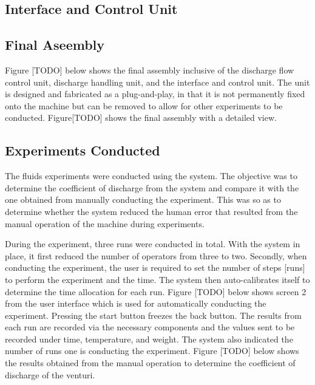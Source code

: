 \subsection{Interface and Control Unit}
\par


\subsection{Final Aseembly}
\par
Figure [TODO] below shows the final assembly inclusive of the discharge flow control unit, discharge handling unit, and the interface and control unit. The unit is designed and fabricated as a plug-and-play, in that it is not permanently fixed onto the machine but can be removed to allow for other experiments to be conducted. Figure[TODO] shows the final assembly with a detailed view.
\subsection{Experiments Conducted}
\par
The fluids experiments were conducted using the system. The objective was to determine the coefficient of discharge from the system and compare it with the one obtained from manually conducting the experiment. This was so as to determine whether the system reduced the human error that resulted from the manual operation of the machine during experiments. 
\par
During the experiment, three runs were conducted in total. With the system in place, it first reduced the number of operators from three to two. Secondly, when conducting the experiment, the user is required to set the number of steps [runs] to perform the experiment and the time. The system then auto-calibrates itself to determine the time allocation for each run. Figure [TODO] below shows screen 2 from the user interface which is used for automatically conducting the experiment. Pressing the start button freezes the back button. The results from each run are recorded via the necessary components and the values sent to be recorded under time, temperature, and weight. The system also indicated the number of runs one is conducting the experiment.
Figure [TODO] below shows the results obtained from the manual operation to determine the coefficient of discharge of the venturi.

